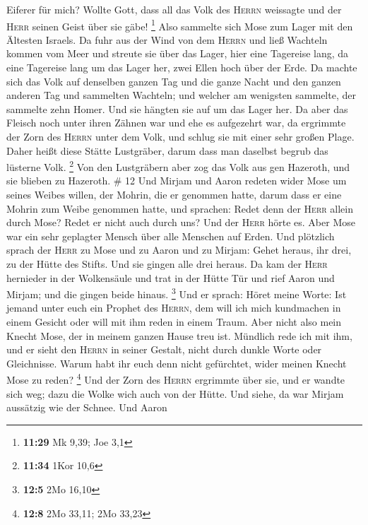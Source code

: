 Eiferer für mich? Wollte Gott, dass all das Volk des \textsc{Herrn}
weissagte und der \textsc{Herr} seinen Geist über sie gäbe! \footnote{\textbf{11:29}
  Mk 9,39; Joe 3,1}  Also sammelte sich Mose zum Lager
mit den Ältesten Israels.  Da fuhr aus der Wind von dem
\textsc{Herrn} und ließ Wachteln kommen vom Meer und streute sie über
das Lager, hier eine Tagereise lang, da eine Tagereise lang um das Lager
her, zwei Ellen hoch über der Erde.  Da machte sich das
Volk auf denselben ganzen Tag und die ganze Nacht und den ganzen anderen
Tag und sammelten Wachteln; und welcher am wenigsten sammelte, der
sammelte zehn Homer. Und sie hängten sie auf um das Lager her.
 Da aber das Fleisch noch unter ihren Zähnen war und ehe
es aufgezehrt war, da ergrimmte der Zorn des \textsc{Herrn} unter dem
Volk, und schlug sie mit einer sehr großen Plage.  Daher
heißt diese Stätte Lustgräber, darum dass man daselbst begrub das
lüsterne Volk. \footnote{\textbf{11:34} 1Kor 10,6}  Von
den Lustgräbern aber zog das Volk aus gen Hazeroth, und sie blieben zu
Hazeroth. \# 12  Und Mirjam und Aaron redeten wider Mose
um seines Weibes willen, der Mohrin, die er genommen hatte, darum dass
er eine Mohrin zum Weibe genommen hatte,  und sprachen:
Redet denn der \textsc{Herr} allein durch Mose? Redet er nicht auch
durch uns? Und der \textsc{Herr} hörte es.  Aber Mose war
ein sehr geplagter Mensch über alle Menschen auf Erden. 
Und plötzlich sprach der \textsc{Herr} zu Mose und zu Aaron und zu
Mirjam: Gehet heraus, ihr drei, zu der Hütte des Stifts. Und sie gingen
alle drei heraus.  Da kam der \textsc{Herr} hernieder in
der Wolkensäule und trat in der Hütte Tür und rief Aaron und Mirjam; und
die gingen beide hinaus. \footnote{\textbf{12:5} 2Mo 16,10}
 Und er sprach: Höret meine Worte: Ist jemand unter euch
ein Prophet des \textsc{Herrn}, dem will ich mich kundmachen in einem
Gesicht oder will mit ihm reden in einem Traum.  Aber
nicht also mein Knecht Mose, der in meinem ganzen Hause treu ist.
 Mündlich rede ich mit ihm, und er sieht den
\textsc{Herrn} in seiner Gestalt, nicht durch dunkle Worte oder
Gleichnisse. Warum habt ihr euch denn nicht gefürchtet, wider meinen
Knecht Mose zu reden? \footnote{\textbf{12:8} 2Mo 33,11; 2Mo 33,23}
 Und der Zorn des \textsc{Herrn} ergrimmte über sie, und
er wandte sich weg;  dazu die Wolke wich auch von der
Hütte. Und siehe, da war Mirjam aussätzig wie der Schnee. Und Aaron
